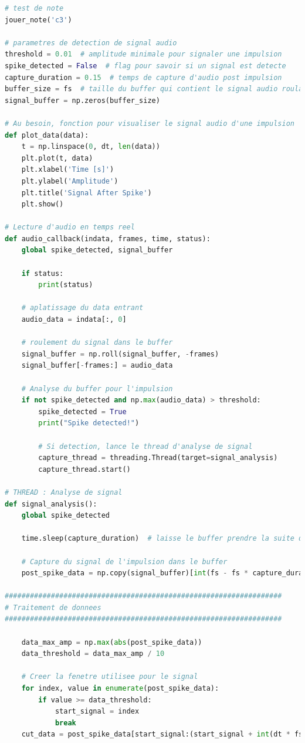 \documentclass[11pt,letterpaper]{article}
\begin{document}
\begin{lstlisting}[language=python]
# test de note
jouer_note('c3')

# parametres de detection de signal audio
threshold = 0.01  # amplitude minimale pour signaler une impulsion
spike_detected = False  # flag pour savoir si un signal est detecte
capture_duration = 0.15  # temps de capture d'audio post impulsion
buffer_size = fs  # taille du buffer qui contient le signal audio roulant
signal_buffer = np.zeros(buffer_size)

# Au besoin, fonction pour visualiser le signal audio d'une impulsion
def plot_data(data):
    t = np.linspace(0, dt, len(data))
    plt.plot(t, data)
    plt.xlabel('Time [s]')
    plt.ylabel('Amplitude')
    plt.title('Signal After Spike')
    plt.show()

# Lecture d'audio en temps reel
def audio_callback(indata, frames, time, status):
    global spike_detected, signal_buffer
    
    if status:
        print(status)
    
    # aplatissage du data entrant
    audio_data = indata[:, 0]
    
    # roulement du signal dans le buffer
    signal_buffer = np.roll(signal_buffer, -frames)
    signal_buffer[-frames:] = audio_data
    
    # Analyse du buffer pour l'impulsion
    if not spike_detected and np.max(audio_data) > threshold:
        spike_detected = True
        print("Spike detected!")
    
        # Si detection, lance le thread d'analyse de signal
        capture_thread = threading.Thread(target=signal_analysis)
        capture_thread.start()

# THREAD : Analyse de signal
def signal_analysis():
    global spike_detected
    
    time.sleep(capture_duration)  # laisse le buffer prendre la suite du signal post impulsion

    # Capture du signal de l'impulsion dans le buffer
    post_spike_data = np.copy(signal_buffer)[int(fs - fs * capture_duration - 800):]
    
##################################################################
# Traitement de donnees
##################################################################

    data_max_amp = np.max(abs(post_spike_data))
    data_threshold = data_max_amp / 10

    # Creer la fenetre utilisee pour le signal
    for index, value in enumerate(post_spike_data):
        if value >= data_threshold:
            start_signal = index
            break
    cut_data = post_spike_data[start_signal:(start_signal + int(dt * fs))].flatten()


\end{lstlisting}
\end{document}

